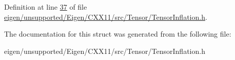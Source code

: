 Definition at line \hyperlink{eigen_2unsupported_2_eigen_2_c_x_x11_2src_2_tensor_2_tensor_inflation_8h_source_l00037}{37} of file \hyperlink{eigen_2unsupported_2_eigen_2_c_x_x11_2src_2_tensor_2_tensor_inflation_8h_source}{eigen/unsupported/\+Eigen/\+C\+X\+X11/src/\+Tensor/\+Tensor\+Inflation.\+h}.



The documentation for this struct was generated from the following file\+:\begin{DoxyCompactItemize}
\item 
eigen/unsupported/\+Eigen/\+C\+X\+X11/src/\+Tensor/\+Tensor\+Inflation.\+h\end{DoxyCompactItemize}
